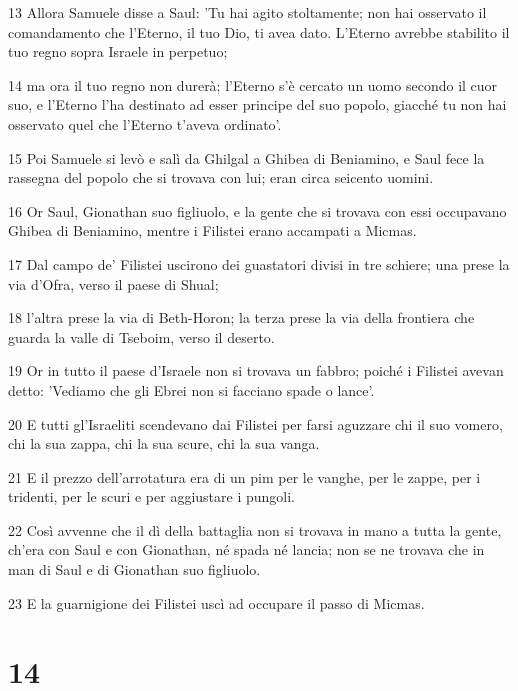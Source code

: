 \par 13 Allora Samuele disse a Saul: 'Tu hai agito stoltamente; non hai osservato il comandamento che l'Eterno, il tuo Dio, ti avea dato. L'Eterno avrebbe stabilito il tuo regno sopra Israele in perpetuo;
\par 14 ma ora il tuo regno non durerà; l'Eterno s'è cercato un uomo secondo il cuor suo, e l'Eterno l'ha destinato ad esser principe del suo popolo, giacché tu non hai osservato quel che l'Eterno t'aveva ordinato'.
\par 15 Poi Samuele si levò e salì da Ghilgal a Ghibea di Beniamino, e Saul fece la rassegna del popolo che si trovava con lui; eran circa seicento uomini.
\par 16 Or Saul, Gionathan suo figliuolo, e la gente che si trovava con essi occupavano Ghibea di Beniamino, mentre i Filistei erano accampati a Micmas.
\par 17 Dal campo de' Filistei uscirono dei guastatori divisi in tre schiere; una prese la via d'Ofra, verso il paese di Shual;
\par 18 l'altra prese la via di Beth-Horon; la terza prese la via della frontiera che guarda la valle di Tseboim, verso il deserto.
\par 19 Or in tutto il paese d'Israele non si trovava un fabbro; poiché i Filistei avevan detto: 'Vediamo che gli Ebrei non si facciano spade o lance'.
\par 20 E tutti gl'Israeliti scendevano dai Filistei per farsi aguzzare chi il suo vomero, chi la sua zappa, chi la sua scure, chi la sua vanga.
\par 21 E il prezzo dell'arrotatura era di un pim per le vanghe, per le zappe, per i tridenti, per le scuri e per aggiustare i pungoli.
\par 22 Così avvenne che il dì della battaglia non si trovava in mano a tutta la gente, ch'era con Saul e con Gionathan, né spada né lancia; non se ne trovava che in man di Saul e di Gionathan suo figliuolo.
\par 23 E la guarnigione dei Filistei uscì ad occupare il passo di Micmas.

\chapter{14}


